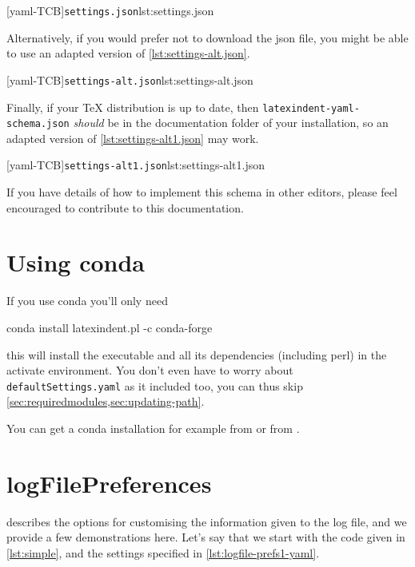 		\begin{widepage}
			[yaml-TCB]{\texttt{settings.json}}{lst:settings.json}
		\end{widepage}

		Alternatively, if you would prefer not to download the json file, you might be able to
		use an adapted version of \cref{lst:settings-alt.json}.

		\begin{widepage}
			[yaml-TCB]{\texttt{settings-alt.json}}{lst:settings-alt.json}
		\end{widepage}

		Finally, if your TeX distribution is up to date, then
		\texttt{latexindent-yaml-schema.json} \emph{should} be in the documentation folder of
		your installation, so an adapted version of \cref{lst:settings-alt1.json} may work.

		\begin{widepage}
			[yaml-TCB]{\texttt{settings-alt1.json}}{lst:settings-alt1.json}
		\end{widepage}

		If you have details of how to implement this schema in other editors, please feel
		encouraged to contribute to this documentation.

	\section{Using conda}
	 If you use conda you'll only need
	 \begin{commandshell}
conda install latexindent.pl -c conda-forge
\end{commandshell}
	 this will install the executable and all its dependencies (including perl) in the
	 activate environment. You don't even have to worry about \texttt{defaultSettings.yaml} as
	 it included too, you can thus skip \cref{sec:requiredmodules,sec:updating-path}.

	 You can get a conda installation for example from \cite{conda} or from \cite{anacoda}.

	\section{logFilePreferences}\label{app:logfile-demo}
	  describes the options for customising the information given
	 to the log file, and we provide a few demonstrations here. Let's say that we start with
	 the code given in \cref{lst:simple}, and the settings specified in
	 \cref{lst:logfile-prefs1-yaml}.

